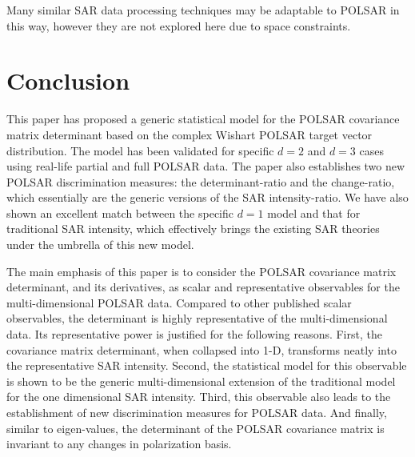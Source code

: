 \documentclass[journal]{IEEEtran}
\begin{document}
Many similar SAR data processing techniques may be adaptable to POLSAR in this way, however they are not explored here due to space constraints.

\section{Conclusion}
\label{sec:conclusion}

This paper has proposed a generic statistical model  for the POLSAR covariance matrix determinant based on the complex Wishart POLSAR target vector distribution.
The model has been validated for specific $d=2$ and $d=3$ cases using real-life partial and full POLSAR data.
The paper also establishes two new POLSAR discrimination measures: the determinant-ratio and the change-ratio,  which essentially are the generic versions of the SAR intensity-ratio.
We have also shown an excellent match between the specific $d=1$ model and that for traditional SAR intensity,
which effectively brings the existing SAR theories under the umbrella of this new model.

The main emphasis of this paper is to consider the POLSAR covariance matrix determinant, and its derivatives, as scalar and representative observables for the multi-dimensional POLSAR data.
Compared to other published scalar observables, the determinant is highly representative of the multi-dimensional data.
Its representative power is justified for the following reasons.
First, the covariance matrix determinant, when collapsed into 1-D, transforms neatly into the representative SAR intensity.
Second, the statistical model for this observable is shown to be the generic multi-dimensional extension of the traditional model for the one dimensional SAR intensity.
Third, this observable also leads to the establishment of new discrimination measures for POLSAR data.
And finally, similar to eigen-values, the determinant of the POLSAR covariance matrix is invariant to any changes in polarization basis.
\end{document}
